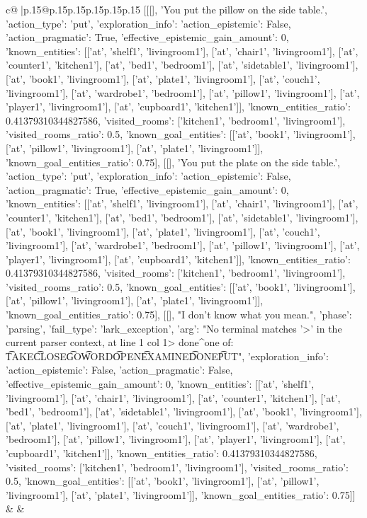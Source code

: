 \documentclass{article}
\begin{document}
{\begin{supertabular}{c@{$\;$}|p{.15\linewidth}@{}p{.15\linewidth}p{.15\linewidth}p{.15\linewidth}p{.15\linewidth}p{.15\linewidth}}
{{{	 [[[], 'You put the pillow on the side table.', {'action_type': 'put', 'exploration_info': {'action_epistemic': False, 'action_pragmatic': True, 'effective_epistemic_gain_amount': 0, 'known_entities': [['at', 'shelf1', 'livingroom1'], ['at', 'chair1', 'livingroom1'], ['at', 'counter1', 'kitchen1'], ['at', 'bed1', 'bedroom1'], ['at', 'sidetable1', 'livingroom1'], ['at', 'book1', 'livingroom1'], ['at', 'plate1', 'livingroom1'], ['at', 'couch1', 'livingroom1'], ['at', 'wardrobe1', 'bedroom1'], ['at', 'pillow1', 'livingroom1'], ['at', 'player1', 'livingroom1'], ['at', 'cupboard1', 'kitchen1']], 'known_entities_ratio': 0.41379310344827586, 'visited_rooms': ['kitchen1', 'bedroom1', 'livingroom1'], 'visited_rooms_ratio': 0.5, 'known_goal_entities': [['at', 'book1', 'livingroom1'], ['at', 'pillow1', 'livingroom1'], ['at', 'plate1', 'livingroom1']], 'known_goal_entities_ratio': 0.75}}], [[], 'You put the plate on the side table.', {'action_type': 'put', 'exploration_info': {'action_epistemic': False, 'action_pragmatic': True, 'effective_epistemic_gain_amount': 0, 'known_entities': [['at', 'shelf1', 'livingroom1'], ['at', 'chair1', 'livingroom1'], ['at', 'counter1', 'kitchen1'], ['at', 'bed1', 'bedroom1'], ['at', 'sidetable1', 'livingroom1'], ['at', 'book1', 'livingroom1'], ['at', 'plate1', 'livingroom1'], ['at', 'couch1', 'livingroom1'], ['at', 'wardrobe1', 'bedroom1'], ['at', 'pillow1', 'livingroom1'], ['at', 'player1', 'livingroom1'], ['at', 'cupboard1', 'kitchen1']], 'known_entities_ratio': 0.41379310344827586, 'visited_rooms': ['kitchen1', 'bedroom1', 'livingroom1'], 'visited_rooms_ratio': 0.5, 'known_goal_entities': [['at', 'book1', 'livingroom1'], ['at', 'pillow1', 'livingroom1'], ['at', 'plate1', 'livingroom1']], 'known_goal_entities_ratio': 0.75}}], [[], "I don't know what you mean.", {'phase': 'parsing', 'fail_type': 'lark_exception', 'arg': "No terminal matches '>' in the current parser context, at line 1 col 1\n\n> done\n^\nExpected one of: \n\t* TAKE\n\t* CLOSE\n\t* GO\n\t* WORD\n\t* OPEN\n\t* EXAMINE\n\t* DONE\n\t* PUT\n", 'exploration_info': {'action_epistemic': False, 'action_pragmatic': False, 'effective_epistemic_gain_amount': 0, 'known_entities': [['at', 'shelf1', 'livingroom1'], ['at', 'chair1', 'livingroom1'], ['at', 'counter1', 'kitchen1'], ['at', 'bed1', 'bedroom1'], ['at', 'sidetable1', 'livingroom1'], ['at', 'book1', 'livingroom1'], ['at', 'plate1', 'livingroom1'], ['at', 'couch1', 'livingroom1'], ['at', 'wardrobe1', 'bedroom1'], ['at', 'pillow1', 'livingroom1'], ['at', 'player1', 'livingroom1'], ['at', 'cupboard1', 'kitchen1']], 'known_entities_ratio': 0.41379310344827586, 'visited_rooms': ['kitchen1', 'bedroom1', 'livingroom1'], 'visited_rooms_ratio': 0.5, 'known_goal_entities': [['at', 'book1', 'livingroom1'], ['at', 'pillow1', 'livingroom1'], ['at', 'plate1', 'livingroom1']], 'known_goal_entities_ratio': 0.75}}]] 
	  } 
	   } 
	   } 
	 & & \\ 
 


\end{supertabular}}
\end{document}
